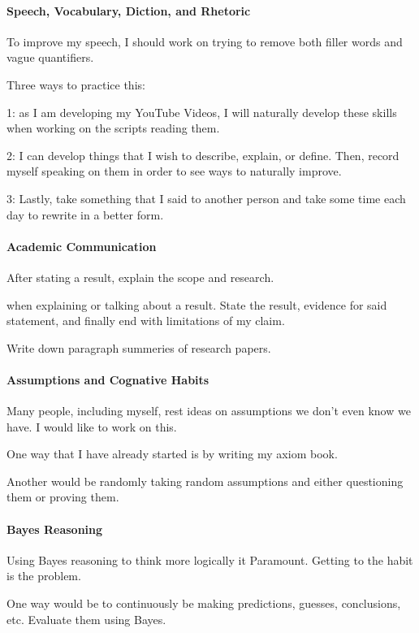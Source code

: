 \paragraph{Speech, Vocabulary, Diction, and Rhetoric}

To improve my speech, I should work on trying to remove both filler words and vague quantifiers.

Three ways to practice this:

1: as I am developing my YouTube Videos, I will naturally develop these skills when working on the scripts reading them.

2: I can develop things that I wish to describe, explain, or define. Then, record myself speaking on them in order to see ways to naturally improve.

3: Lastly, take something that I said to another person and take some time each day to rewrite in a better form.

\paragraph{Academic Communication}

After stating a result, explain the scope and research.

when explaining or talking about a result. State the result, evidence for said statement, and finally end with limitations of my claim.

Write down paragraph summeries of research papers.

\paragraph{Assumptions and Cognative Habits}

Many people, including myself, rest ideas on assumptions we don't even know we have. I would like to work on this.

One way that I have already started is by writing my axiom book.

Another would be randomly taking random assumptions and either questioning them or proving them.

\paragraph{Bayes Reasoning}

Using Bayes reasoning to think more logically it Paramount. Getting to the habit is the problem.

One way would be to continuously be making predictions, guesses, conclusions, etc. Evaluate them using Bayes.

